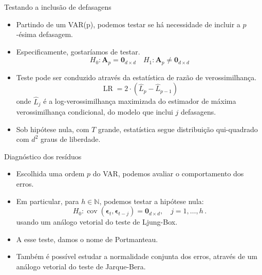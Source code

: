 \documentclass[11pt]{beamer}
\begin{document}
\begin{frame}{Testando a inclusão de defasagens}
\begin{itemize}
	\item Partindo de um VAR(p), podemos testar se há necessidade de incluir a $p$-ésima defasagem.
	\item Especificamente, gostaríamos de testar.
	\begin{equation}
		H_0: \boldsymbol{A}_p = \boldsymbol{0}_{d \times d} \quad H_1:  \boldsymbol{A}_p \neq \boldsymbol{0}_{d \times d}
	\end{equation} 
	\item Teste pode ser conduzido através da estatística de razão de verossimilhança.
	\begin{equation}
		\operatorname{LR} = 2\cdot(\hat{L}_{p} - \hat{L}_{p-1})
	\end{equation}
	onde $\hat{L}_j$ é a log-verossimilhança maximizada do estimador de máxima verossimilhança condicional, do modelo que inclui $j$ defasagens.
	\item Sob hipótese nula, com $T$ grande, estatística segue distribuição qui-quadrado com $d^2$ graus de liberdade.
\end{itemize}
\end{frame}

\begin{frame}{Diagnóstico dos resíduos}
	\begin{itemize}
		\item Escolhida uma ordem $p$ do VAR, podemos avaliar o comportamento dos erros.
		\item Em particular, para $h \in \mathbb{N}$, podemos testar a hipótese nula:
		$$H_0: \operatorname{cov}(\boldsymbol{\epsilon}_{t}, \boldsymbol{\epsilon}_{t-j}) = \boldsymbol{0}_{d\times d}, \quad j=1,\ldots, h\, .$$
		usando um análogo vetorial do teste de Ljung-Box.
		\item A esse teste, damos o nome de Portmanteau.
		\item Também é possível estudar a normalidade conjunta dos erros, através de um análogo vetorial do teste de Jarque-Bera.
	\end{itemize}
\end{frame}
\end{document}
